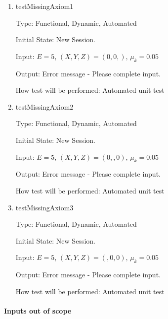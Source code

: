 \documentclass[12pt, titlepage]{article}
\begin{document}
\begin{enumerate}

\item{testMissingAxiom1\\}

Type: Functional, Dynamic, Automated

Initial State: New Session.

Input: $E = 5$, $(X,Y,Z) = (0,0,)$, $\mu_{k} = 0.05$  

Output: Error message - Please complete input.

How test will be performed: Automated unit test 

\item{testMissingAxiom2\\}

Type: Functional, Dynamic, Automated

Initial State: New Session.

Input: $E = 5$, $(X,Y,Z) = (0,,0)$, $\mu_{k} = 0.05$  

Output: Error message - Please complete input.

How test will be performed: Automated unit test 

\item{testMissingAxiom3\\}

Type: Functional, Dynamic, Automated

Initial State: New Session.

Input: $E = 5$, $(X,Y,Z) = (,0,0)$, $\mu_{k} = 0.05$  

Output: Error message - Please complete input.

How test will be performed: Automated unit test 

\end{enumerate}

\paragraph{Inputs out of scope}
\end{document}
